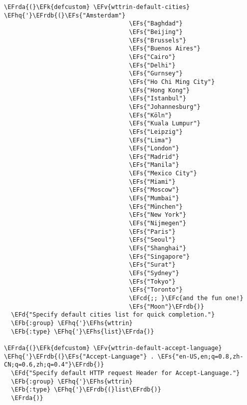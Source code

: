 \documentclass[a4wide,10pt]{article}
\newcommand{\EFc}[1]{\textcolor{EFc}{#1}} %
\newcommand{\EFcd}[1]{\textcolor{EFcd}{#1}} %
\newcommand{\EFs}[1]{\textcolor{EFs}{#1}} %
\newcommand{\EFd}[1]{\textcolor{EFd}{#1}} %
\newcommand{\EFk}[1]{\textcolor{EFk}{#1}} %
\newcommand{\EFb}[1]{\textcolor{EFb}{#1}} %
\newcommand{\EFv}[1]{\textcolor{EFv}{#1}} %
\newcommand{\EFhq}[1]{\textcolor{EFhq}{#1}} %
\newcommand{\EFhs}[1]{\textcolor{EFhs}{#1}} %
\newcommand{\EFrda}[1]{\textcolor{EFrda}{#1}} %
\newcommand{\EFrdb}[1]{\textcolor{EFrdb}{#1}} %
\begin{document}
\begin{Code}
\begin{Verbatim}
\EFrda{(}\EFk{defcustom} \EFv{wttrin-default-cities} \EFhq{'}\EFrdb{(}\EFs{"Amsterdam"}
                                   \EFs{"Baghdad"}
                                   \EFs{"Beijing"}
                                   \EFs{"Brussels"}
                                   \EFs{"Buenos Aires"}
                                   \EFs{"Cairo"}
                                   \EFs{"Delhi"}
                                   \EFs{"Gurnsey"}
                                   \EFs{"Ho Chi Ming City"}
                                   \EFs{"Hong Kong"}
                                   \EFs{"Istanbul"}
                                   \EFs{"Johannesburg"}
                                   \EFs{"Köln"}
                                   \EFs{"Kuala Lumpur"}
                                   \EFs{"Leipzig"}
                                   \EFs{"Lima"}
                                   \EFs{"London"}
                                   \EFs{"Madrid"}
                                   \EFs{"Manila"}
                                   \EFs{"Mexico City"}
                                   \EFs{"Miami"}
                                   \EFs{"Moscow"}
                                   \EFs{"Mumbai"}
                                   \EFs{"München"}
                                   \EFs{"New York"}
                                   \EFs{"Nijmegen"}
                                   \EFs{"Paris"}
                                   \EFs{"Seoul"}
                                   \EFs{"Shanghai"}
                                   \EFs{"Singapore"}
                                   \EFs{"Surat"}
                                   \EFs{"Sydney"}
                                   \EFs{"Tokyo"}
                                   \EFs{"Toronto"}
                                   \EFcd{;; }\EFc{and the fun one!}
                                   \EFs{"Moon"}\EFrdb{)}
  \EFd{"Specify default cities list for quick completion."}
  \EFb{:group} \EFhq{'}\EFhs{wttrin}
  \EFb{:type} \EFhq{'}\EFhs{list}\EFrda{)}

\EFrda{(}\EFk{defcustom} \EFv{wttrin-default-accept-language} \EFhq{'}\EFrdb{(}\EFs{"Accept-Language"} . \EFs{"en-US,en;q=0.8,zh-CN;q=0.6,zh;q=0.4"}\EFrdb{)}
  \EFd{"Specify default HTTP request Header for Accept-Language."}
  \EFb{:group} \EFhq{'}\EFhs{wttrin}
  \EFb{:type} \EFhq{'}\EFrdb{(}list\EFrdb{)}
  \EFrda{)}


\end{Verbatim}
\end{Code}
\end{document}
